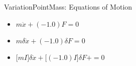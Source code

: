 VariationPointMass: Equations of Motion
\begin{itemize}
\item $m \ddot{x}+(-1.0) F=0$
\item $m \delta \ddot{x}+(-1.0) \delta F=0$
\item $\Big[m I\Big]\delta \ddot{x}+\Big[(-1.0) I\Big]\delta F+=0$
\end{itemize}